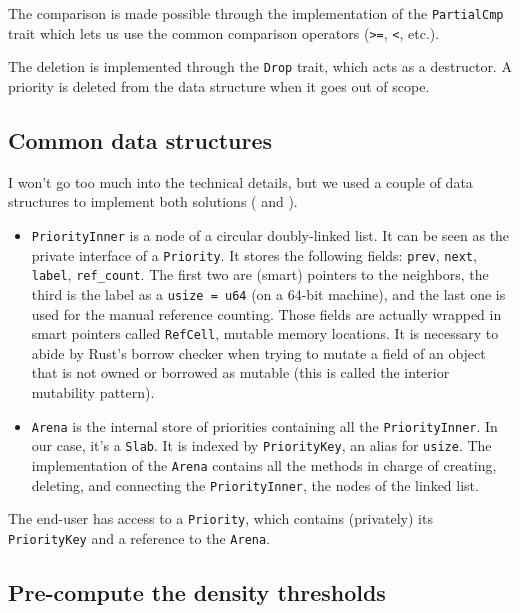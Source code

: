 \documentclass[12pt]{article}
\begin{document}
The comparison is made possible through the implementation of the \lstinline{PartialCmp} trait which lets us use the common comparison operators (\lstinline{>=}, \lstinline{<}, etc.).

The deletion is implemented through the \lstinline{Drop} trait, which acts as a destructor. A priority is deleted from the data structure when it goes out of scope.

\subsection{Common data structures}

I won't go too much into the technical details, but we used a couple of data structures to implement both solutions (\cite{10.5555/647912.740822} and \cite{10.1145/28395.28434}).

\begin{itemize}
  \item \lstinline{PriorityInner} is a node of a circular doubly-linked list. It can be seen as the private interface of a \lstinline{Priority}. It stores the following fields: \lstinline{prev}, \lstinline{next}, \lstinline{label}, \lstinline{ref_count}. The first two are (smart) pointers to the neighbors, the third is the label as a \lstinline{usize = u64} (on a 64-bit machine), and the last one is used for the manual reference counting. Those fields are actually wrapped in smart pointers called \lstinline{RefCell}, mutable memory locations. It is necessary to abide by Rust's borrow checker when trying to mutate a field of an object that is not owned or borrowed as mutable (this is called the interior mutability pattern).
  \item \lstinline{Arena} is the internal store of priorities containing all the \lstinline{PriorityInner}. In our case, it's a \lstinline{Slab}. It is indexed by \lstinline{PriorityKey}, an alias for \lstinline{usize}. The implementation of the \lstinline{Arena} contains all the methods in charge of creating, deleting, and connecting the \lstinline{PriorityInner}, the nodes of the linked list.
\end{itemize}

The end-user has access to a \lstinline{Priority}, which contains (privately) its \lstinline{PriorityKey} and a reference to the \lstinline{Arena}.

\subsection{Pre-compute the density thresholds}
\end{document}
